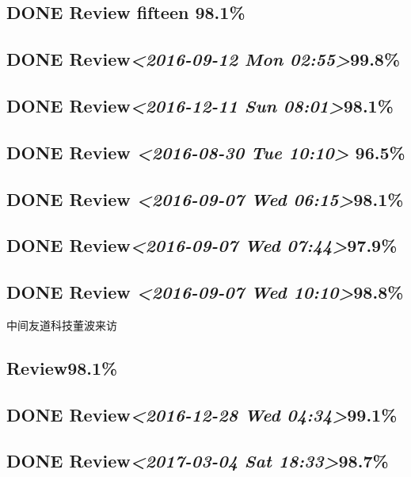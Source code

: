 \documentclass[11pt]{ctexart}
\begin{document}
\subsection{{\bfseries\sffamily DONE} Review fifteen 98.1\%}
\label{sec:orgc55a430}

\subsection{{\bfseries\sffamily DONE} Review\textit{<2016-09-12 Mon 02:55>}99.8\%}
\label{sec:org7c15b83}
\subsection{{\bfseries\sffamily DONE} Review\textit{<2016-12-11 Sun 08:01>}98.1\%}
\label{sec:org167e3a8}
\subsection{{\bfseries\sffamily DONE} Review \textit{<2016-08-30 Tue 10:10> } 96.5\%}
\label{sec:org1fb44af}
\subsection{{\bfseries\sffamily DONE} Review \textit{<2016-09-07 Wed 06:15>}98.1\%}
\label{sec:org35a3815}
\subsection{{\bfseries\sffamily DONE} Review\textit{<2016-09-07 Wed 07:44>}97.9\%}
\label{sec:org86c5c46}
\subsection{{\bfseries\sffamily DONE} Review \textit{<2016-09-07 Wed 10:10>}98.8\%}
\label{sec:org131fc23}
中间友道科技董波来访
\subsection{Review98.1\%}
\label{sec:orge4bbd81}
\subsection{{\bfseries\sffamily DONE} Review\textit{<2016-12-28 Wed 04:34>}99.1\%}
\label{sec:org4728d44}
\subsection{{\bfseries\sffamily DONE} Review\textit{<2017-03-04 Sat 18:33>}98.7\%}
\label{sec:orgf11d0b3}
\end{document}
